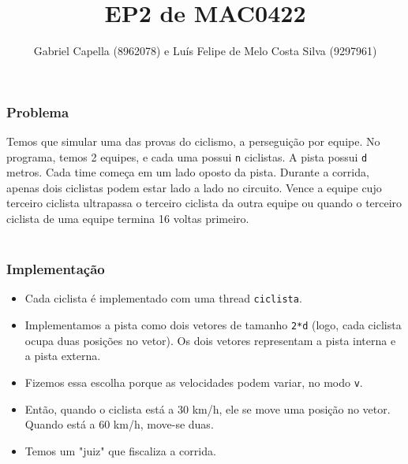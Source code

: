 \documentclass{beamer}
\title[EP2]{EP2 de MAC0422} %
\author{Gabriel Capella (8962078) e Luís Felipe de Melo Costa Silva (9297961)} %
\institute[USP] %
{
IME-USP\\ %
\medskip
}
\begin{document}
\begin{frame}
\titlepage %
\end{frame}




\begin{frame}
\frametitle{Problema}
Temos que simular uma das provas do ciclismo, a perseguição por equipe. No programa, temos 2 equipes, e cada uma possui \texttt{n} ciclistas. A pista possui \texttt{d} metros. Cada time começa em um lado oposto da pista. Durante a corrida, apenas dois ciclistas podem estar lado a lado no circuito. Vence a equipe cujo terceiro ciclista ultrapassa o terceiro ciclista da outra equipe ou quando o terceiro ciclista de uma equipe termina 16 voltas primeiro.\\~\\

\end{frame}

\begin{frame}
\frametitle{Implementação}	
\begin{itemize}
\item Cada ciclista é implementado com uma thread \texttt{ciclista}. 
\item Implementamos a pista como dois vetores de tamanho \texttt{2*d} (logo, cada ciclista ocupa duas posições no vetor). Os dois vetores representam a pista interna e a pista externa.
\item Fizemos essa escolha porque as velocidades podem variar, no modo \texttt{v}. 
\item Então, quando o ciclista está a 30 km/h, ele se move uma posição no vetor. Quando está a 60 km/h, move-se duas.
\item Temos um "juiz" que fiscaliza a corrida.
\end{itemize}
\end{frame}
\end{document}
